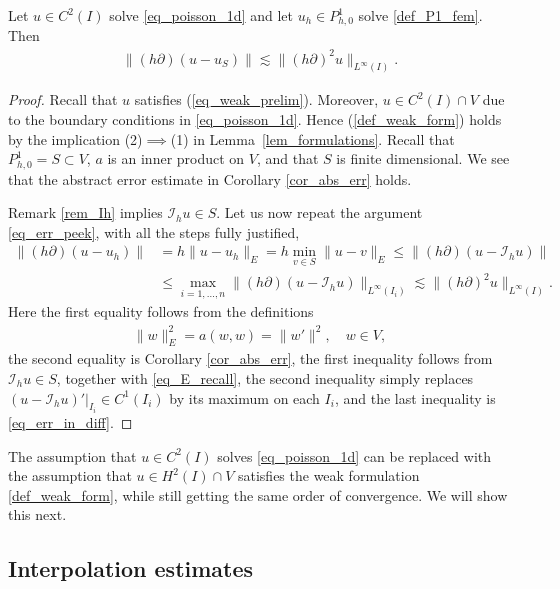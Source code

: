 \documentclass[12pt,oneside,final]{amsart}
\def\I{\mathcal I}
\begin{document}
\begin{theorem}
Let $u \in C^2(I)$ solve \eqref{eq_poisson_1d}
and let $u_h \in P_{h,0}^1$ solve \eqref{def_P1_fem}.
Then
    \begin{align*}
\|(h\partial)(u-u_S)\|
\lesssim
\|(h \partial)^2 u\|_{L^\infty(I)}.
    \end{align*}
\end{theorem}
\begin{proof}
Recall that $u$ satisfies (\ref{eq_weak_prelim}).
Moreover, $u \in C^2(I) \cap V$ due to the boundary conditions in \eqref{eq_poisson_1d}. Hence (\ref{def_weak_form}) holds by the implication (2)$\implies$(1) in Lemma~\ref{lem_formulations}.
Recall that $P_{h,0}^1 = S \subset V$,
$a$ is an inner product on $V$, and that $S$ is finite dimensional. 
We see that the abstract error estimate in Corollary \ref{cor_abs_err} holds.

Remark \ref{rem_Ih} implies $\I_h u \in S$. Let us now repeat the argument \eqref{eq_err_peek}, with all the steps fully justified,
    \begin{align*}
\|(h\partial)(u-u_h)\|
&= 
h\|u-u_h\|_E 
= 
h \min_{v \in S}\|u-v\|_E
\le 
\|(h\partial)(u-\I_h u)\|
\\&\le
\max_{i=1,\dots,n}\|(h\partial)(u - \I_h u)\|_{L^\infty(I_i)} 
\lesssim
\|(h \partial)^2 u\|_{L^\infty(I)}.
    \end{align*}
Here the first equality follows from the definitions 
    \begin{align}\label{eq_E_recall}
\|w\|_E^2 = a(w,w) = \|w'\|^2, \quad w \in V,
    \end{align}
the second equality is Corollary \ref{cor_abs_err},
the first inequality follows from $\I_h u \in S$, together with \eqref{eq_E_recall}, 
the second inequality simply replaces $(u - \I_h u)'|_{I_i} \in C^1(I_i)$ by its maximum on each $I_i$, and the last inequality is \eqref{eq_err_in_diff}.
\end{proof}

The assumption that $u \in C^2(I)$ solves \eqref{eq_poisson_1d}
can be replaced with the assumption that $u \in H^2(I) \cap V$ satisfies the weak formulation \eqref{def_weak_form},
while still getting the same order of convergence. We will show this next. 

\subsection{Interpolation estimates\label{sec_interp}}
\end{document}
